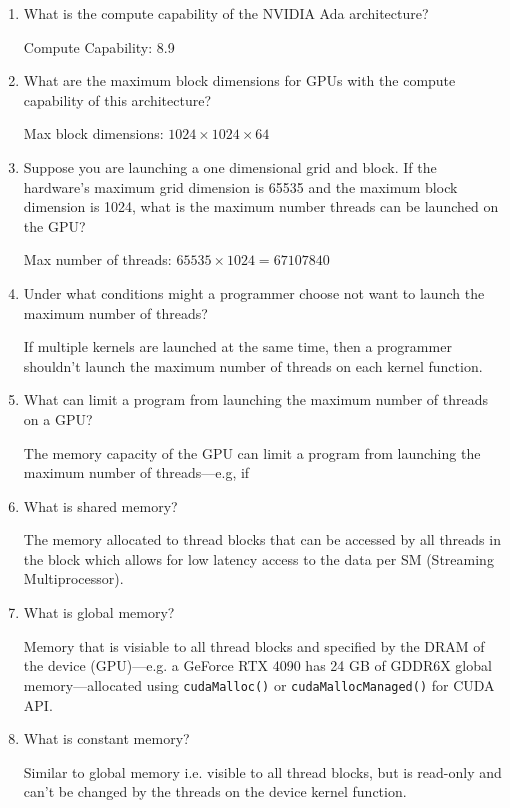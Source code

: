 \documentclass[../main.tex]{subfiles}
\begin{document}
\begin{enumerate}
    \item What is the compute capability of the NVIDIA Ada architecture?

    Compute Capability: 8.9

    \item What are the maximum block dimensions for GPUs with the compute
    capability of this architecture?

    Max block dimensions: $1024 \times 1024 \times 64$

    \item Suppose you are launching a one dimensional grid and block. If the
    hardware’s maximum grid dimension is 65535 and the maximum block
    dimension is 1024, what is the maximum number threads can be launched
    on the GPU?

    Max number of threads: $65535 \times 1024 = 67107840$

    \item Under what conditions might a programmer choose not want to launch
    the maximum number of threads?

    If multiple kernels are launched at the same time, then a programmer shouldn't launch
    the maximum number of threads on each kernel function.

    \item What can limit a program from launching the maximum number of threads
    on a GPU?

    The memory capacity of the GPU can limit a program from launching the
    maximum number of threads---e.g, if 

    \item What is shared memory?
    
    The memory allocated to thread blocks that can be accessed by all threads in the block which
    allows for low latency access to the data per SM (Streaming Multiprocessor).

    \item What is global memory?
    
    Memory that is visiable to all thread blocks and specified by the DRAM of the device
    (GPU)---e.g. a GeForce RTX 4090 has 24 GB of GDDR6X global
    memory---allocated using \texttt{cudaMalloc()} or
    \texttt{cudaMallocManaged()} for CUDA API.

    \item What is constant memory?
    
    Similar to global memory i.e. visible to all thread blocks, but is read-only and can't be
    changed by the threads on the device kernel function.


\end{enumerate}
\end{document}
